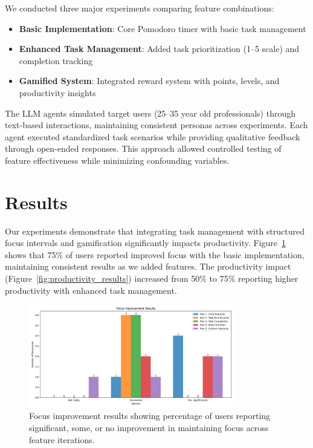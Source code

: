 \documentclass{article} %
\begin{document}
We conducted three major experiments comparing feature combinations:

\begin{itemize}
    \item \textbf{Basic Implementation}: Core Pomodoro timer with basic task management
    \item \textbf{Enhanced Task Management}: Added task prioritization (1--5 scale) and completion tracking
    \item \textbf{Gamified System}: Integrated reward system with points, levels, and productivity insights
\end{itemize}

The LLM agents simulated target users (25--35 year old professionals) through text-based interactions, maintaining consistent personas across experiments. Each agent executed standardized task scenarios while providing qualitative feedback through open-ended responses. This approach allowed controlled testing of feature effectiveness while minimizing confounding variables.

\section{Results}
\label{sec:results}

Our experiments demonstrate that integrating task management with structured focus intervals and gamification significantly impacts productivity. Figure~\ref{fig:focus_results} shows that 75\% of users reported improved focus with the basic implementation, maintaining consistent results as we added features. The productivity impact (Figure~\ref{fig:productivity_results}) increased from 50\% to 75\% reporting higher productivity with enhanced task management.

\begin{figure}[h]
  \centering
  \includegraphics[width=0.8\textwidth]{focus_improvement_bar.png}
  \caption{Focus improvement results showing percentage of users reporting significant, some, or no improvement in maintaining focus across feature iterations.}
  \label{fig:focus_results}
\end{figure}
\end{document}
